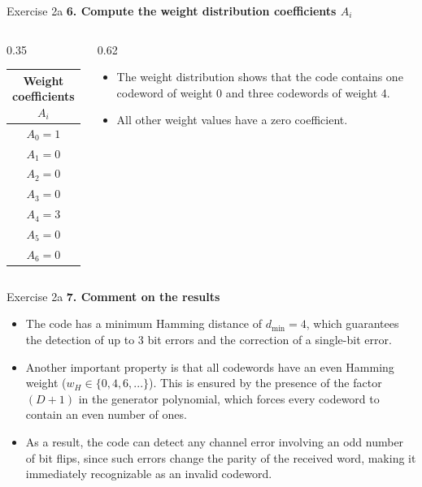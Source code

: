 \documentclass[10pt, aspectratio=169]{beamer}
\newcommand{\question}[1]{{\color{QuestionRed}\textbf{#1}}}
\begin{document}
\begin{frame}{Exercise 2a}
  \question{6. Compute the weight distribution coefficients $A_i$}

  \vspace{0.25cm}
  \begin{columns}[T]
    \begin{column}{0.35\textwidth}
      \centering
      \small
      \begin{tabular}{c}
        \toprule
        \textbf{Weight coefficients $A_i$} \\
        \midrule
        $A_0 = 1$ \\
        $A_1 = 0$ \\
        $A_2 = 0$ \\
        $A_3 = 0$ \\
        $A_4 = 3$ \\
        $A_5 = 0$ \\
        $A_6 = 0$ \\
        \bottomrule
      \end{tabular}
    \end{column}
    \begin{column}{0.62\textwidth}
      \vspace{0.3cm}
      \begin{itemize}
        \item The weight distribution shows that the code contains one codeword of weight 0 and three codewords of weight 4.
        \item All other weight values have a zero coefficient.
      \end{itemize}
    \end{column}
  \end{columns}
\end{frame}

\begin{frame}{Exercise 2a}
  \question{7. Comment on the results}

  \vspace{0.25cm}
  \begin{itemize}
    \item The code has a minimum Hamming distance of $d_{\min} = 4$, which guarantees the detection of up to 3 bit errors and the correction of a single-bit error.
    \item Another important property is that all codewords have an even Hamming weight ($w_H \in \{0, 4, 6, ...\}$). This is ensured by the presence of the factor $(D+1)$ in the generator polynomial, which forces every codeword to contain an even number of ones.
    \item As a result, the code can detect any channel error involving an odd number of bit flips, since such errors change the parity of the received word, making it immediately recognizable as an invalid codeword.
  \end{itemize}
\end{frame}
\end{document}
